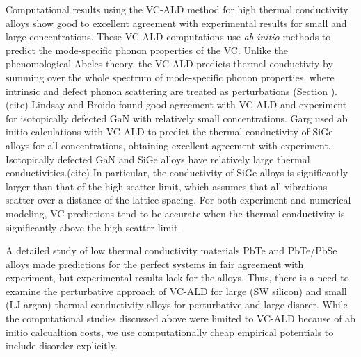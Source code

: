 \documentclass[aps,prb,onecolumn,preprint,superscriptaddress,amsmath,amssymb,floatfix]{revtex4}
\begin{document}
Computational results using the VC-ALD method  
for high thermal conductivity 
alloys show good to excellent agreement with experimental results for 
small and large concentrations.
\cite{garg_role_2011,lindsay_thermal_2012} These VC-ALD computations 
use \emph{ab initio} methods to predict 
the mode-specific phonon properties of the VC. Unlike the phenomological 
Abeles theory, the VC-ALD predicts thermal conductivty by summing 
over the whole spectrum of mode-specific phonon properties, where 
intrinsic and defect phonon scattering are treated as perturbations 
(Section ).(cite)  
Lindsay and Broido 
found good agreement with VC-ALD and experiment for 
isotopically defected GaN with relatively small concentrations.
\cite{lindsay_thermal_2012}  
Garg used ab initio calculations with VC-ALD   
to predict the thermal conductivity of SiGe alloys 
for all concentrations, obtaining excellent agreement with experiment.
\cite{garg_role_2011}  
Isotopically defected GaN and SiGe alloys have relatively large 
thermal conductivities.(cite) In 
particular, the conductivity of SiGe alloys is significantly 
larger than that of the high scatter limit, which assumes that all 
vibrations scatter over a distance of the lattice spacing.
\cite{cahill_lattice_1988}  
For both experiment and numerical modeling, VC predictions tend 
to be accurate when the thermal conductivity is significantly above 
the high-scatter limit.
\cite{abeles_lattice_1963,kamitakahara_vibrations_1974,
cahill_thermal_2004,cahill_thermal_2005,
cahill_lattice_1988,garg_role_2011,lindsay_thermal_2012} 

A detailed study of low thermal conductivity materials 
PbTe\cite{shiga_microscopic_2012} and PbTe/PbSe\cite{tian_phonon_2012} 
alloys 
made predictions for the perfect systems in fair agreement with 
experiment, but experimental results lack for the alloys.
\cite{kudman_1972,pei_convergence_2011} 
Thus, there is a need to examine the perturbative approach of 
VC-ALD for large (SW silicon) and small (LJ argon) 
thermal conductivity alloys for perturbative and large disorer. 
While the computational studies discussed above were limited to VC-ALD 
because of ab initio calcualtion costs, we use computationally 
cheap empirical potentials to include disorder explicitly. 
\end{document}
